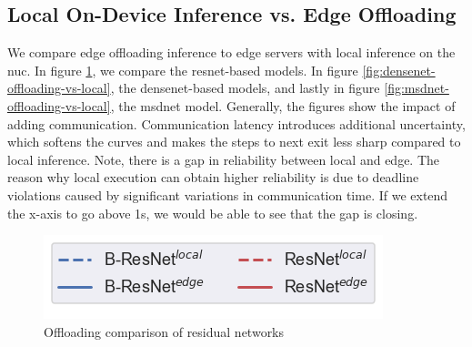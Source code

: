 \subsection{Local On-Device Inference vs. Edge Offloading}

We compare edge offloading inference to edge servers with local inference on the \gls{nuc}. In figure \ref{fig:resnet-offloading-vs-local}, we compare the \gls{resnet}-based models. In figure \ref{fig:densenet-offloading-vs-local}, the \gls{densenet}-based models, and lastly in figure \ref{fig:msdnet-offloading-vs-local}, the \gls{msdnet} model.
Generally, the figures show the impact of adding communication. Communication latency introduces additional uncertainty, which softens the curves and makes the steps to next exit less sharp compared to local inference. Note, there is a gap in reliability between local and edge. The reason why local execution can obtain higher reliability is due to deadline violations caused by significant variations in communication time. If we extend the x-axis to go above 1s, we would be able to see that the gap is closing. 
\begin{figure}
	\captionsetup[subfigure]{justification=centering, farskip=0pt,captionskip=0pt}
	\centering
	\includegraphics[width=.3\linewidth]{figures/edge/gpu_b-resnet_offloading_vs_local_legend}
	\hfill
	\hfill
	\caption[Offloading comparison of residual networks]{Offloading comparison of residual networks}
	\label{fig:resnet-offloading-vs-local}
\end{figure}

